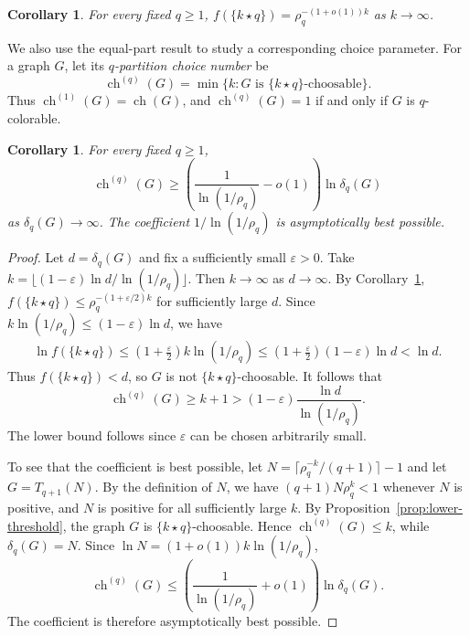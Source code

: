 \documentclass[12pt]{article}
\numberwithin{equation}{section}
\newtheorem{corollary}[theorem]{Corollary}
\theoremstyle{definition}
\newcommand{\equalparts}[2]{\{#1\star #2\}}
\begin{document}
\begin{corollary}\label{cor:equal-threshold}
For every fixed $q\geq 1$, $f(\equalparts{k}{q})=\rho_q^{-(1+o(1))k}$ as $k\to\infty$. 
\end{corollary}

We also use the equal-part result to study a corresponding choice parameter.
For a graph $G$, let its \emph{$q$-partition choice number} be
\[
 \operatorname{ch}^{(q)}(G)
 =\min\{k:G\text{ is }\equalparts{k}{q}\text{-choosable}\}.
\]
Thus $\operatorname{ch}^{(1)}(G)=\operatorname{ch}(G)$, and
$\operatorname{ch}^{(q)}(G)=1$ if and only if $G$ is $q$-colorable.

\begin{corollary}\label{cor:partition-choice}
For every fixed $q\geq1$,
\[
 \operatorname{ch}^{(q)}(G)\geq
 \left(\frac{1}{\ln(1/\rho_q)}-o(1)\right)\ln\delta_q(G)
\]
as $\delta_q(G)\to\infty$. The coefficient
$1/\ln(1/\rho_q)$ is asymptotically best possible.
\end{corollary}

\begin{proof}
Let $d=\delta_q(G)$ and fix a sufficiently small $\varepsilon>0$. Take
$k=\lfloor(1-\varepsilon)\ln d/\ln(1/\rho_q)\rfloor$.
Then $k\to\infty$ as $d\to\infty$. By Corollary~\ref{cor:equal-threshold}, $f(\equalparts{k}{q})\leq \rho_q^{-(1+\varepsilon/2)k}$ for sufficiently large $d$.
Since $k\ln(1/\rho_q)\leq(1-\varepsilon)\ln d$, we have
\[
 \begin{aligned}
 \ln f(\equalparts{k}{q}) \leq \left(1+\frac{\varepsilon}{2}\right)
 k\ln(1/\rho_q) \leq \left(1+\frac{\varepsilon}{2}\right)
 (1-\varepsilon)\ln d
 <\ln d.
 \end{aligned}
\] 
Thus $f(\equalparts{k}{q})<d$, so $G$ is not
$\equalparts{k}{q}$-choosable. It follows that
\[
 \operatorname{ch}^{(q)}(G)\geq k+1
 >(1-\varepsilon)\frac{\ln d}{\ln(1/\rho_q)}.
\]
The lower bound follows since $\varepsilon$ can be chosen arbitrarily small.

To see that the coefficient is best possible, let
$N=\lceil\rho_q^{-k}/(q+1)\rceil-1$ and let $G=T_{q+1}(N)$.
By the definition of $N$, we have $(q+1)N\rho_q^k<1$ whenever $N$ is positive,
and $N$ is positive for all sufficiently large $k$.
By Proposition~\ref{prop:lower-threshold}, the graph $G$ is
$\equalparts{k}{q}$-choosable. Hence
$\operatorname{ch}^{(q)}(G)\leq k$, while $\delta_q(G)=N$. Since
$\ln N=(1+o(1))k\ln(1/\rho_q)$,
\[
 \operatorname{ch}^{(q)}(G)
 \leq\left(\frac{1}{\ln(1/\rho_q)}+o(1)\right)
 \ln\delta_q(G).
\]
The coefficient is therefore asymptotically best possible.
\end{proof}
\end{document}
